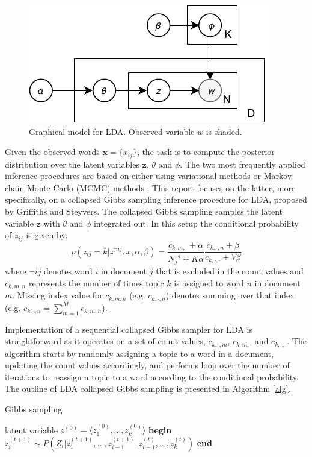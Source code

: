 \documentclass[journal]{IEEEtran}
\begin{document}
\begin{figure}
\centering
\includegraphics[scale=0.9]{plots/LDA.pdf}
\caption{Graphical model for LDA. Observed variable $w$ is shaded.}
\label{fig:lda}
\end{figure}

Given the observed words $\textbf{x}=\{x_{ij}\}$, the task is to compute the posterior distribution over the latent variables $\texttt{z}$, $\theta$ and $\phi$. The two most frequently applied inference procedures are based on either using variational methods\cite{blei2003latent} or Markov chain Monte Carlo (MCMC) methods \cite{griffiths2004finding}. This report focuses on the latter, more specifically, on a collapsed Gibbs sampling inference procedure for LDA, proposed by Griffiths and Steyvers\cite{griffiths2004finding}. The collapsed Gibbs sampling samples the latent variable $\texttt{z}$ with $\theta$ and $\phi$ integrated out. In this setup the conditional probability of $z_{ij}$ is given by:
$$
p(z_{ij}=k|z^{\lnot ij}, x, \alpha, \beta) = \dfrac{c_{k,m,\cdot} + \alpha}{N_{j}^{\lnot i}+K\alpha} \frac{c_{k,\cdot,n} + \beta}{c_{k,\cdot,\cdot} + V\beta}
$$ 
where $\lnot ij$ denotes word $i$ in document $j$ that is excluded in the count values and $c_{k,m,n}$ represents the number of times topic $k$ is assigned to word $n$ in document $m$. Missing index value for $c_{k,m,n}$ (e.g. $c_{k,\cdot,n}$) denotes summing over that index (e.g. $c_{k,\cdot,n} = \sum_{m=1}^{M} c_{k,m,n}$).

Implementation of a sequential collapsed Gibbs sampler for LDA is straightforward as it operates on a set of count values, $c_{k,\cdot,m}$, $c_{k,m,\cdot}$ and $c_{k,\cdot,\cdot}$. The algorithm starts by randomly assigning a topic to a word in a  document, updating the count values accordingly, and performs loop over the number of iterations to reassign a topic to a word according to the conditional probability. The outline of LDA collapsed Gibbs sampling is presented in Algorithm \ref{alg}.
 \begin{algorithm}
\caption{Gibbs sampling}
\label{alg}
\begin{algorithmic}
\scriptsize
\Require latent variable $z^{(0)} = \langle z_1^{(0)},...,z_k^{(0)}\rangle$
\State \textbf{begin}
         \State $z^{(t+1)}_i \sim P(Z_i | z_1^{(t+1)},...,z_{i-1}^{(t+1)},z_{i+1}^{(t)},...,z_k^{(t)})$
      \EndFor 
   \EndFor
\State \textbf{end}
        \end{algorithmic}
    \end{algorithm}
\end{document}

